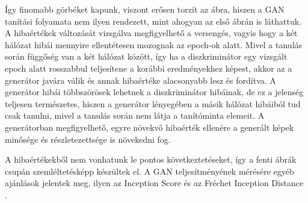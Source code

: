 Így finomabb görbéket kapunk, viszont erősen torzít az ábra, hiszen a GAN tanítási folyamata nem ilyen rendezett, mint ahogyan az első ábrán is láthattuk.
A hibaértékek változását vizsgálva megfigyelhető a versengés, vagyis hogy a két hálózat hibái mennyire ellentétesen mozognak az epoch-ok alatt. Mivel a tanulás során függőség van a két hálózat között, így ha a diszkriminátor egy vizsgált epoch alatt rosszabbul teljesítene a korábbi eredményekhez képest, akkor az a generátor javára válik és annak hibaértéke alacsonyabb lesz és fordítva. A generátor hibái többszörösek lehetnek a diszkriminátor hibáinak, de ez a jelenség teljesen természetes, hiszen a generátor lényegében a másik hálózat hibáiból tud csak tanulni, mivel a tanulás során nem látja a tanítóminta elemeit. A generátorban megfigyelhető, egyre növekvő hibaérték ellenére a generált képek minősége és részletezettsége is növekedni fog.

A hibaértékekből nem vonhatunk le pontos következtetéseket, így a fenti ábrák csupán szemléltetésképp készültek el. A GAN teljesítményének mérésére egyéb ajánlások jelentek meg, ilyen az Inception Score \cite{salimans2016improved} és az Fréchet Inception Distance \cite{heusel2017gans}.


